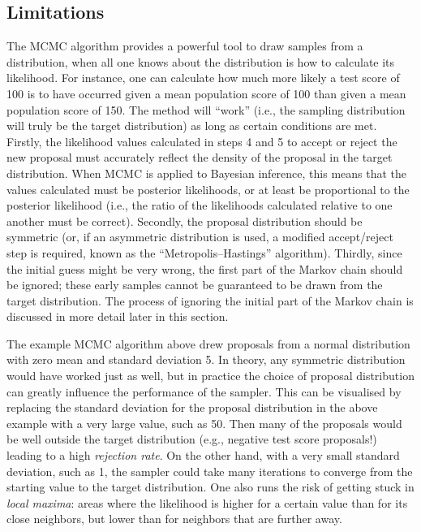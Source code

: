 \subsection{Limitations}

The MCMC algorithm provides a powerful tool to draw samples from a distribution, when all one knows about the distribution is how to calculate its likelihood. For instance, one can calculate how much more likely a test score of 100 is to have occurred given a mean population score of 100 than given a mean population score of 150. The method will ``work'' (i.e., the sampling distribution will truly be the target distribution) as long as certain conditions are met. Firstly, the likelihood values calculated in steps 4 and 5 to accept or reject the new proposal must accurately reflect the density of the proposal in the target distribution. When MCMC is applied to Bayesian inference, this means that the values calculated must be posterior likelihoods, or at least be proportional to the posterior likelihood (i.e., the ratio of the likelihoods calculated relative to one another must be correct). Secondly, the proposal distribution should be symmetric (or, if an asymmetric distribution is used, a modified accept/reject step is required, known as the ``Metropolis--Hastings'' algorithm). Thirdly, since the initial guess might be very wrong, the first part of the Markov chain should be ignored; these early samples cannot be guaranteed to be drawn from the target distribution. The process of ignoring the initial part of the Markov chain is discussed in more detail later in this section.

The example MCMC algorithm above drew proposals from a normal distribution with zero mean and standard deviation 5. In theory, any symmetric distribution would have worked just as well, but in practice the choice of proposal distribution can greatly influence the performance of the sampler. This can be visualised by replacing the standard deviation for the proposal distribution in the above example with a very large value, such as 50. Then many of the proposals would be well outside the target distribution (e.g., negative test score proposals!) leading to a high \emph{rejection rate}. On the other hand, with a very small standard deviation, such as 1, the sampler could take many iterations to converge from the starting value to the target distribution. One also runs the risk of getting stuck in \emph{local maxima}: areas where the likelihood is higher for a certain value than for its close neighbors, but lower than for neighbors that are further away.

